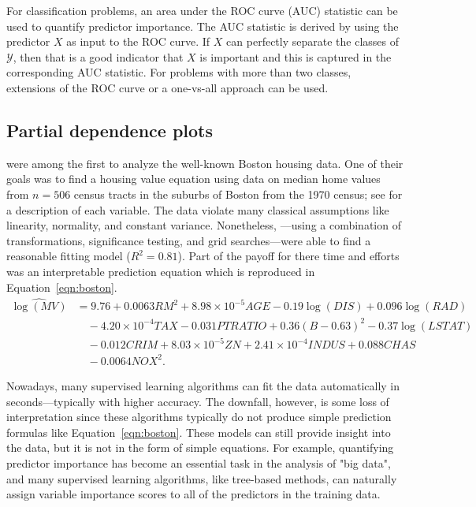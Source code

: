 \documentclass[12pt]{article}
\begin{document}
For classification problems, an area under the ROC curve (AUC) statistic can be used to quantify predictor importance. The AUC statistic is derived by using the predictor $X$ as input to the ROC curve. If $X$ can perfectly separate the classes of $\mathcal{Y}$, then that is a good indicator that $X$ is important and this is captured in the corresponding AUC statistic. For problems with more than two classes, extensions of the ROC curve or a one-vs-all approach can be used.


\subsection{Partial dependence plots}

\citet{harrison-1978-hedonic} were among the first to analyze the well-known Boston housing data. One of their goals was to find a housing value equation using data on median home values from $n = 506$ census tracts in the suburbs of Boston from the 1970 census; see \citet[Table IV]{harrison-1978-hedonic} for a description of each variable. The data violate many classical assumptions like linearity, normality, and constant variance. Nonetheless, \citeauthor{harrison-1978-hedonic}---using a combination of transformations, significance testing, and grid searches---were able to find a reasonable fitting model ($R^2 = 0.81$). Part of the payoff for there time and efforts was an interpretable prediction equation which is reproduced in Equation~\eqref{eqn:boston}.
\begin{equation}
\label{eqn:boston}
\begin{aligned}
\widehat{\log\left(MV\right)} &= 9.76 + 0.0063 RM^2 + 8.98\times10^{-5} AGE - 0.19\log\left(DIS\right) + 0.096\log\left(RAD\right) \\
  & \quad - 4.20\times10^{-4} TAX - 0.031 PTRATIO + 0.36\left(B - 0.63\right)^2 - 0.37\log\left(LSTAT\right) \\
  & \quad - 0.012 CRIM + 8.03\times10^{-5} ZN + 2.41\times10^{-4} INDUS + 0.088 CHAS \\
  & \quad - 0.0064 NOX^2.
\end{aligned}
\end{equation}

Nowadays, many supervised learning algorithms can fit the data automatically in seconds---typically with higher accuracy. The downfall, however, is some loss of interpretation since these algorithms typically do not produce simple prediction formulas like Equation~\eqref{eqn:boston}. These models can still provide insight into the data, but it is not in the form of simple equations. For example, quantifying predictor importance has become an essential task in the analysis of "big data", and many supervised learning algorithms, like tree-based methods, can naturally assign variable importance scores to all of the predictors in the training data.
\end{document}
